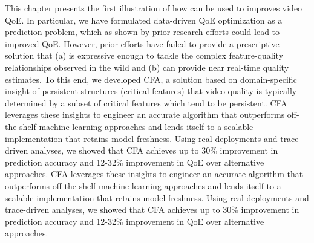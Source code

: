 This chapter presents the first illustration of how \ddn can be used
to improves video QoE. 
In particular, we have formulated data-driven
QoE optimization as  a prediction problem, which as shown by prior
research efforts could lead to improved QoE. 
However, prior efforts have failed to provide a prescriptive solution
that (a) is expressive enough to tackle the complex
feature-quality relationships observed in the wild and (b)
can provide near real-time quality estimates. To this end,
we developed CFA, a solution based on domain-specific
insight of persistent structures (critical features) 
that video quality is typically determined by a
subset of critical features which tend to be persistent.
CFA leverages these insights to engineer an accurate algorithm
that outperforms off-the-shelf machine learning
approaches and lends itself to a scalable implementation
that retains model freshness. Using real deployments and
trace-driven analyses, we showed that CFA achieves up
to 30\% improvement in prediction accuracy and 12-32\%
improvement in QoE over alternative approaches.
%
CFA leverages these insights to engineer an accurate algorithm
that outperforms off-the-shelf machine learning
approaches and lends itself to a scalable implementation
that retains model freshness. Using real deployments and
trace-driven analyses, we showed that CFA achieves up
to 30\% improvement in prediction accuracy and 12-32\%
improvement in QoE over alternative approaches.




